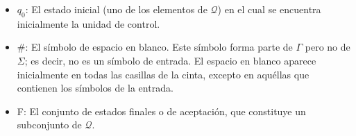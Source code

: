 \documentclass[12pt,a4paper,spanish]{book}
\begin{document}
\begin{itemize}
\begin{itemize}
estado q y un s\'imbolo de cinta X. El valor de $\delta$(q,X), si est\'a definido, es una
tupla (p,Y,S), donde:
\begin{enumerate}
\item p es el estado siguiente de $\mathcal{Q}$.
\item Y es el s\'imbolo de $\Gamma$, que se escribe en la casilla se\~nalada por la
cabeza de la cinta y que sustituye al s\'imbolo que se encontraba en dicha casilla.
\item S es un sentido, I, D o N (``izquierda'', ``derecha'' o ``ninguno'' respectivamente),
que nos indica el sentido en el que se mueve la cabeza.
\end{enumerate}
\item $q_{0}$: El estado inicial (uno de los elementos de $\mathcal{Q}$) en el cual se encuentra
inicialmente la unidad de control.
\item \#: El s\'imbolo de espacio en blanco. Este s\'imbolo forma parte de $\Gamma$
pero no de $\Sigma$; es decir, no es un s\'imbolo de entrada. El espacio en blanco
aparece inicialmente en todas las casillas de la cinta, excepto en aqu\'ellas que
contienen los s\'imbolos de la entrada.
\item F: El conjunto de estados finales o de aceptaci\'on, que constituye un
subconjunto de $\mathcal{Q}$.
\end{itemize}






\end{itemize}
\end{document}
